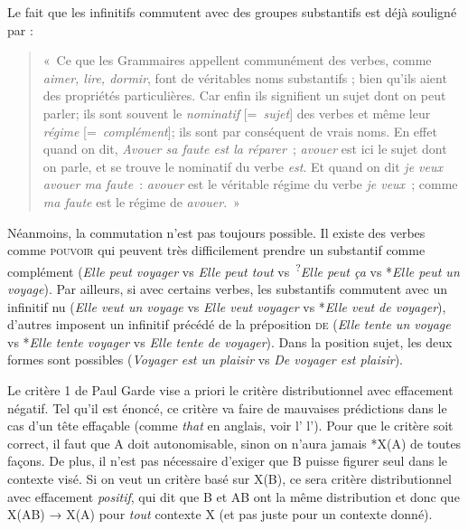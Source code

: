 {     Le fait que les infinitifs commutent avec des groupes substantifs est déjà souligné par \citet[59]{buffier1709grammaire} : 
    \begin{quote}
        «~Ce que les Grammaires appellent communément des verbes, comme \textit{aimer, lire, dormir}, font de véritables noms substantifs ; bien qu’ils aient des propriétés particulières. Car enfin ils signifient un sujet dont on peut parler; ils sont souvent le \textit{nominatif} [=~\textit{sujet}] des verbes et même leur \textit{régime} [=~\textit{complément}]; ils sont par conséquent de vrais noms. En effet quand on dit, \textit{Avouer sa faute est la réparer~}; \textit{avouer} est ici le sujet dont on parle, et se trouve le nominatif du verbe \textit{est}. Et quand on dit \textit{je veux avouer ma faute~}: \textit{avouer} est le véritable régime du verbe \textit{je veux~}; comme \textit{ma faute} est le régime de \textit{avouer}.~»
    \end{quote}

    Néanmoins, la commutation n’est pas toujours possible. Il existe des verbes comme \textsc{pouvoir} qui peuvent très difficilement prendre un substantif comme complément (\textit{Elle peut voyager} vs \textit{Elle peut tout} vs~\textsuperscript{?}\textit{Elle peut ça} vs *\textit{Elle peut un voyage}). Par ailleurs, si avec certains verbes, les substantifs commutent avec un infinitif nu (\textit{Elle veut un voyage} vs \textit{Elle veut voyager} vs *\textit{Elle veut de voyager}), d’autres imposent un infinitif précédé de la préposition \textsc{de} (\textit{Elle tente un voyage} vs *\textit{Elle tente voyager} vs \textit{Elle tente de voyager}). Dans la position sujet, les deux formes sont possibles (\textit{Voyager est un plaisir} vs \textit{De voyager est plaisir}).

     Le critère 1 de Paul Garde vise a priori le critère distributionnel avec effacement négatif. Tel qu'il est énoncé, ce critère va faire de mauvaises prédictions dans le cas d'un tête effaçable (comme \textit{that} en anglais, voir l' l’). Pour que le critère soit correct, il faut que A doit autonomisable, sinon on n'aura jamais *X(A) de toutes façons. De plus, il n'est pas nécessaire d'exiger que B puisse figurer seul dans le contexte visé. Si on veut un critère basé sur X(B), ce sera critère distributionnel avec effacement \textit{positif}, qui dit que B et AB ont la même distribution et donc que X(AB) → X(A) pour \textit{tout} contexte X (et pas juste pour un contexte donné).
    
}
